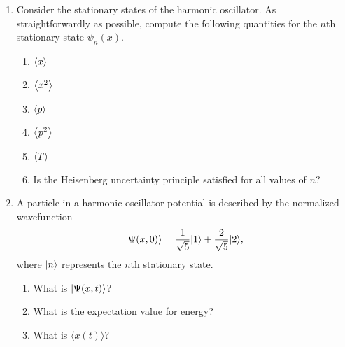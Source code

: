 \documentclass[a4paper, 12pt]{config/homework}
\begin{document}
\begin{enumerate}
\pagebreak
\item Consider the stationary states of the harmonic oscillator. As straightforwardly as possible, compute the following quantities for the \(n\)th stationary state \(\psi_n(x)\).
\begin{enumerate}[label=(\alph*)]
\item \(\expval{x}\)
\item \(\expval{x^2}\)
\item \(\expval{p}\)
\item \(\expval{p^2}\)
\item \(\expval{T}\)
\item Is the Heisenberg uncertainty principle satisfied for all values of \(n\)?
\end{enumerate}

\pagebreak
\item A particle in a harmonic oscillator potential is described by the normalized wavefunction
\[\ket*{\Psi(x,0)} = \frac{1}{\sqrt{5}}\ket*{1} + \frac{2}{\sqrt{5}}\ket*{2},\]
where \(\ket*{n}\) represents the \(n\)th stationary state.
\begin{enumerate}[label=(\alph*)]
\item What is \(\ket*{\Psi(x,t)}\)?
\item What is the expectation value for energy?
\item What is \(\langle x(t) \rangle\)?
\end{enumerate}

\end{enumerate}
\end{document}
